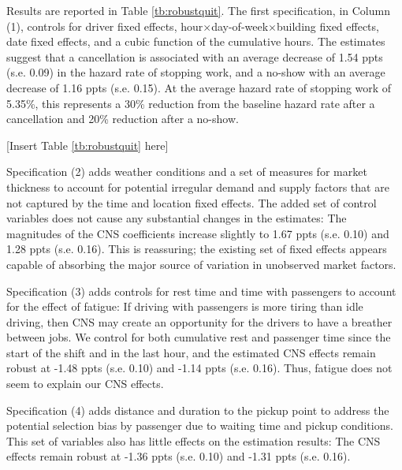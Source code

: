 \documentclass[reviewmode,AEJ]{AEA}
\begin{document}
Results %
are reported in Table \ref{tb:robustquit}. 
The first specification, in Column (1), controls for driver fixed effects, hour\(\times\)day-of-week\(\times\)building fixed effects, date fixed effects, and a cubic function of the cumulative hours. The estimates %
suggest that a cancellation is associated with an average decrease of 1.54 ppts (s.e. 0.09) in the hazard rate of stopping work, and a no-show with an average decrease
of 1.16 ppts (s.e. 0.15). At the average hazard rate of stopping work of 5.35\%, this represents a 30\% reduction from the baseline hazard rate after a cancellation and 20\% reduction after a no-show.

\begin{center}
	[Insert Table \ref{tb:robustquit} here]
\end{center}

Specification (2) adds weather conditions and a set of measures for market thickness to account for potential irregular demand and supply factors that are not captured by the time and location fixed effects. The added set of control variables does not cause any substantial changes in the estimates: The magnitudes of the CNS coefficients increase slightly to 1.67 ppts (s.e. 0.10) and 1.28 ppts (s.e. 0.16). This is reassuring; the existing set of fixed effects appears capable of absorbing the major source of variation in unobserved market factors.

Specification (3) adds controls for rest time and time with passengers %
 to account for the effect of fatigue: If driving with passengers %
is more tiring than idle driving, then CNS may create an opportunity for the drivers to have a breather between jobs. We control for both cumulative rest and passenger time since the start of the shift and in the last hour, and the estimated CNS effects remain robust at -1.48 ppts (s.e. 0.10) and -1.14 ppts (s.e. 0.16). Thus, fatigue does not seem to explain our CNS effects. %

Specification (4) adds distance and duration to the pickup point to address the potential selection bias by passenger due to waiting time and pickup conditions. This set of variables also has little effects on the estimation results: The CNS effects remain robust at -1.36 ppts (s.e. 0.10) and -1.31 ppts (s.e. 0.16).
\end{document}
